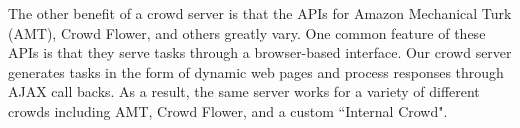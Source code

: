 The other benefit of a crowd server is that the APIs for Amazon Mechanical Turk (AMT), Crowd Flower, and others greatly vary.
One common feature of these APIs is that they serve tasks through a browser-based interface.
Our crowd server generates tasks in the form of dynamic web pages and process responses through AJAX call backs.
As a result, the same server works for a variety of different crowds including AMT, Crowd Flower, and a custom ``Internal Crowd".